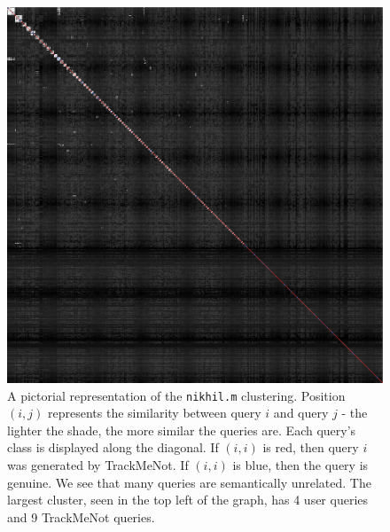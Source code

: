 \documentclass{llncs}
\begin{document}
\begin{multicols}{2}
  \begin{figure}[h]
    \centering
    \includegraphics[width=\linewidth]{disco_nikhil_600.png}
    \caption{A pictorial representation of the \texttt{nikhil.m}
      clustering. Position $(i,j)$ represents the similarity between
      query $i$ and query $j$ - the lighter the shade, the more
      similar the queries are. Each query's class is displayed along
      the diagonal. If $(i,i)$ is red, then query $i$ was generated by
      TrackMeNot. If $(i,i)$ is blue, then the query is genuine. We
      see that many queries are semantically unrelated. The largest
      cluster, seen in the top left of the graph, has 4 user queries
      and 9 TrackMeNot queries.}
    \label{fig:disco.nikhil}
  \end{figure}


\end{multicols}
\end{document}
